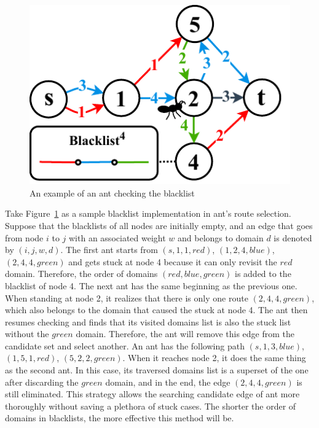 \setlength{\intextsep}{3pt}
\renewcommand{\scalefigure}{1}
\begin{figure}[htbp]
	\centering
	\includegraphics[scale=\scalefigure]{Figures/chap 3/BlacklistV2.pdf}
	\caption{An example of an ant checking the blacklist}
	\label{fig:blacklist}
\end{figure}

Take Figure~\ref{fig:blacklist} as a sample blacklist implementation in ant's route selection. Suppose that the blacklists of all nodes are initially empty, and an edge that goes from node $i$ to $j$ with an associated weight $w$ and belongs to domain $d$ is denoted by $(i, j, w, d)$. The first ant starts from $(s, 1, 1, red)$, $(1, 2, 4, blue)$, $(2, 4, 4, green)$ and gets stuck at node 4 because it can only revisit the $red$ domain. Therefore, the order of domains $(red, blue, green)$ is added to the blacklist of node 4. The next ant has the same beginning as the previous one. When standing at node 2, it realizes that there is only one route $(2, 4, 4, green)$, which also belongs to the domain that caused the stuck at node 4. The ant then resumes checking and finds that its visited domains list is also the stuck list without the $green$ domain. Therefore, the ant will remove this edge from the candidate set and select another. An ant has the following path $(s, 1, 3, blue)$, $(1, 5, 1, red)$, $(5, 2, 2, green)$. When it reaches node 2, it does the same thing as the second ant. In this case, its traversed domains list is a superset of the one after discarding the $green$ domain, and in the end, the edge $(2, 4, 4, green)$ is still eliminated. This strategy allows the searching candidate edge of ant more thoroughly without saving a plethora of stuck cases. The shorter the order of domains in blacklists, the more effective this method will be.